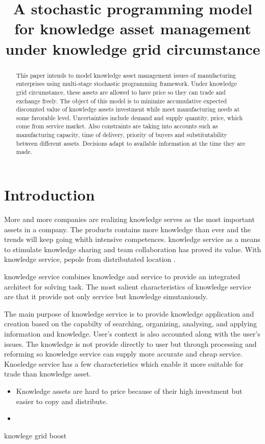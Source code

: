 \documentclass{article}
\begin{document}
\title {A stochastic programming model for knowledge asset management under knowledge grid circumstance}
\maketitle
\begin{abstract}
  This paper intends to model knowledge asset management issues of manufacturing enterprises using multi-stage stochastic programming framework. Under knowledge grid circumstance, these assets are allowed to have price so they can trade and exchange freely. The object of this model is to minimize accumulative expected discounted value of knowledge assets investment while meet manufacturing needs at some favorable level. Uncertainties include demand and supply quantity, price, which come from service market. Also constraints are taking into accounts such as manufacturing capacity, time of delivery, priority of buyers and substitutability between different assets. Decisions adapt to available information at the time they are made.
\end{abstract}

\section{Introduction}
\label{sec:introduction}

 More and more companies are realizing knowledge serves as the most important assets in a company. The products contains more knowledge than ever and the trends will keep going whith intensive competences. knowledge service as a means to stimulate knowledge sharing and team collaboration has proved its value. With knowledge service, pepole from distributated location .

knowledge service combines knowledge and service to provide an integrated architect for solving task. The most salient characteristics of knowledge service are that it provide not only service but knowledge simutaniously. 

The main purpose of knowledge service is to provide knowledge application and creation based on the capabilty of searching, organizing, analysing, and applying information and knowledge. User's context is also accounted along with the user's issues. The knowledge is not provide directly to user but through processing and reforming so knowledge service can supply more accurate and cheap service. 
Knoeledge service has a few characteristics which enable it more suitable for trade than knowledge asset.
\begin{itemize}
\item Knowledge assets are hard to price because of their high investment but easier to copy and distribute.
\item 
\end{itemize}

knowlege grid  boost
\end{document}
